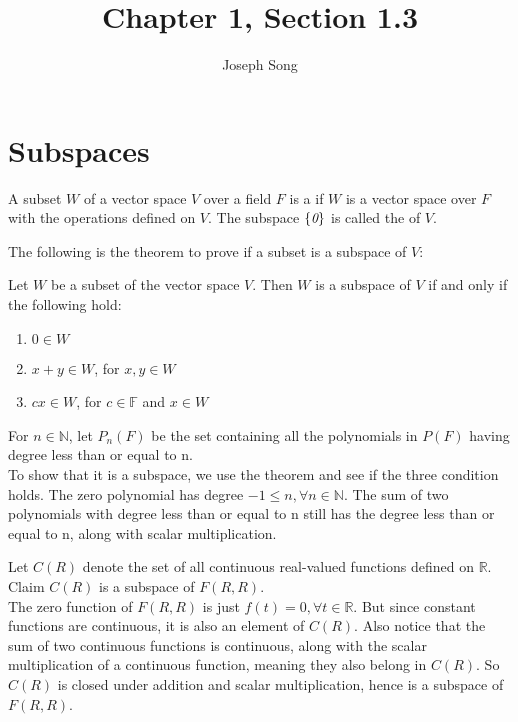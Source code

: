 \documentclass{article}
\title{Chapter 1, Section 1.3}
\author{Joseph Song}
\date{}
\begin{document}
\maketitle

\section{Subspaces}

\begin{definition}[Subspace]
A subset $W$ of a vector space $V$ over a field $F$ is a  if $W$ is a vector space over $F$ with the operations defined on $V$. The subspace $\{ \emph{0} \}$ is called the  of $V$.
\end{definition}

The following is the theorem to prove if a subset is a subspace of $V$:

\begin{theorem}
    Let $W$ be a subset of the vector space $V$. Then $W$ is a subspace of $V$ if and only if the following hold:
\end{theorem}
\begin{enumerate}[label=(\arabic*)]
    \item $0 \in W$
    \item $x + y \in W$, for $x, y \in W$
    \item $cx \in W$, for $c \in \mathbb{F}$ and $x \in W$
\end{enumerate}
\begin{example}[Polynomials]
\end{example}
For $n \in \mathbb{N}$, let $P_n(F)$ be the set containing all the polynomials in $P(F)$ having degree less than or equal to n.
\\
To show that it is a subspace, we use the theorem and see if the three condition holds. The zero polynomial has degree $-1 \leq n, \forall n \in \mathbb{N}$.
The sum of two polynomials with degree less than or equal to n still has the degree less than or equal to n, along with scalar multiplication.

\begin{example}[Functions]
\end{example}

Let $C(R)$ denote the set of all continuous real-valued functions defined on $\mathbb{R}$. Claim $C(R)$ is a subspace of $F(R, R)$.
\\
The zero function of $F(R,R)$ is just $f(t) = 0, \forall t\in \mathbb{R}$. But since constant functions are continuous, it is also an element of $C(R)$. Also notice that the sum of two continuous functions is continuous, along with the scalar multiplication of a continuous function, meaning they also belong in $C(R)$. So $C(R)$ is closed under addition and scalar multiplication, hence is a subspace of $F(R,R)$.
\\
\end{document}
